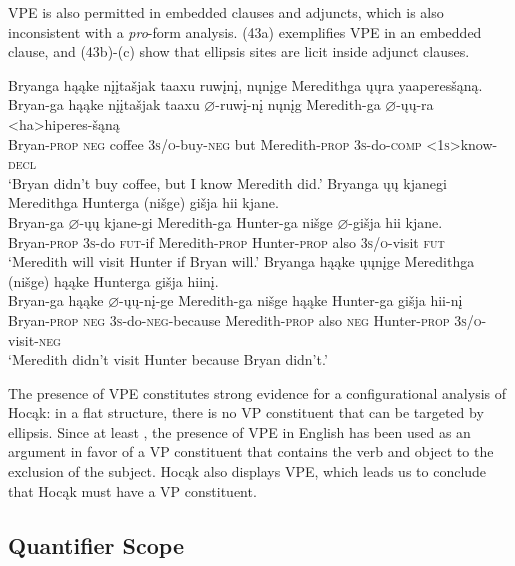 \documentclass[output=paper]{LSP/langsci}
\begin{document}
VPE is also permitted in embedded clauses and adjuncts, which is also inconsistent with a \textit{pro}-form analysis. (43a) exemplifies VPE in an embedded clause, and (43b)-(c) show that ellipsis sites are licit inside adjunct clauses.

\ea
\ea
\glll Bryanga	hąąke	{n\k{i}\k{i}ta\v{s}jak taaxu}		ruw\k{i}n\k{i},		n\k{u}n\k{i}ge		Meredithga \k{u}\k{u}ra 	yaaperes\v{s}ąną. \\
Bryan-ga hąąke	{n\k{i}\k{i}ta\v{s}jak taaxu} $\varnothing$-ruw\k{i}-n\k{i} n\k{u}n\k{i}g	Meredith-ga $\varnothing$-\k{u}\k{u}-ra	<ha>hiperes-\v{s}ąną \\
Bryan-\textsc{prop}	\textsc{neg}	coffee	 \textsc{3s/o}-buy-\textsc{neg} but	 Meredith-\textsc{prop} \textsc{3s}-do-\textsc{comp}	\textsc{<1s>}know-\textsc{decl} \\
\trans `Bryan didn't buy coffee, but I know Meredith did.'
\ex 
\glll Bryanga	\k{u}\k{u}	kjanegi	Meredithga	Hunterga	(ni\v{s}ge)	 {gi\v{s}ja hii} kjane.\\
Bryan-ga	$\varnothing$-\k{u}\k{u}  kjane-gi	 Meredith-ga	Hunter-ga	ni\v{s}ge  {$\varnothing$-gi\v{s}ja hii} kjane. \\
Bryan-\textsc{prop} \textsc{3s}-do	\textsc{fut}-if	 Meredith-\textsc{prop} Hunter-\textsc{prop}	 also	 \textsc{3s/o}-visit	 \textsc{fut} \\
\trans `Meredith will visit Hunter if Bryan will.'
\ex 
\glll Bryanga			hąąke	\k{u}\k{u}n\k{i}ge	Meredithga		(ni\v{s}ge)		hąąke Hunterga	{gi\v{s}ja hiin\k{i}.}\\
Bryan-ga	hąąke	$\varnothing$-\k{u}\k{u}-n\k{i}-ge	Meredith-ga	 ni\v{s}ge	hąąke  Hunter-ga  {gi\v{s}ja hii-n\k{i}} \\
Bryan-\textsc{prop}	\textsc{neg}	\textsc{3s}-do-\textsc{neg}-because Meredith-\textsc{prop} also	\textsc{neg} Hunter-\textsc{prop} \textsc{3s/o}-visit-\textsc{neg} \\
\trans `Meredith didn't visit Hunter because Bryan didn't.'
\z
\z

The presence of VPE constitutes strong evidence for a configurational analysis of Hocąk: in a flat structure, there is no VP constituent that can be targeted by ellipsis. Since at least \citet{Ross1969}, the presence of VPE in English has been used as an argument in favor of a VP constituent that contains the verb and object to the exclusion of the subject. Hocąk also displays VPE, which leads us to conclude that Hocąk must have a VP constituent.

\subsection{Quantifier Scope}
\end{document}
